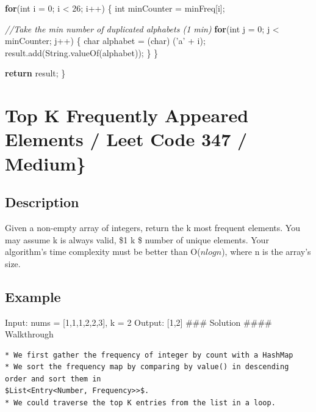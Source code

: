 \documentclass[]{book}
\newenvironment{Shaded}{\begin{snugshade}}{\end{snugshade}}
\newcommand{\BuiltInTok}[1]{#1}
\newcommand{\CharTok}[1]{\textcolor[rgb]{0.31,0.60,0.02}{#1}}
\newcommand{\CommentTok}[1]{\textcolor[rgb]{0.56,0.35,0.01}{\textit{#1}}}
\newcommand{\DataTypeTok}[1]{\textcolor[rgb]{0.13,0.29,0.53}{#1}}
\newcommand{\DecValTok}[1]{\textcolor[rgb]{0.00,0.00,0.81}{#1}}
\newcommand{\FunctionTok}[1]{\textcolor[rgb]{0.00,0.00,0.00}{#1}}
\newcommand{\KeywordTok}[1]{\textcolor[rgb]{0.13,0.29,0.53}{\textbf{#1}}}
\newcommand{\NormalTok}[1]{#1}
\begin{document}
\begin{Shaded}
\begin{Highlighting}[]
    \KeywordTok{for}\NormalTok{(}\DataTypeTok{int}\NormalTok{ i = }\DecValTok{0}\NormalTok{; i < }\DecValTok{26}\NormalTok{; i++) \{}
        \DataTypeTok{int}\NormalTok{ minCounter = minFreq[i];}

        \CommentTok{//Take the min number of duplicated alphabets (1 min)}
        \KeywordTok{for}\NormalTok{(}\DataTypeTok{int}\NormalTok{ j = }\DecValTok{0}\NormalTok{; j < minCounter; j++) \{}
            \DataTypeTok{char}\NormalTok{ alphabet = (}\DataTypeTok{char}\NormalTok{) (}\CharTok{'a'}\NormalTok{ + i);}
\NormalTok{            result.}\FunctionTok{add}\NormalTok{(}\BuiltInTok{String}\NormalTok{.}\FunctionTok{valueOf}\NormalTok{(alphabet));}
\NormalTok{        \}}
\NormalTok{    \}}

    \KeywordTok{return}\NormalTok{ result;}
\NormalTok{\}}
\end{Highlighting}
\end{Shaded}

\hypertarget{top-k-frequently-appeared-elements-leet-code-347-medium}{%
\section{Top K Frequently Appeared Elements / Leet Code 347 / Medium\}}\label{top-k-frequently-appeared-elements-leet-code-347-medium}}

\hypertarget{description-24}{%
\subsection{Description}\label{description-24}}

Given a non-empty array of integers, return the k most frequent elements. You may assume k is always valid,
\$1 \le k \le \$ number of unique elements. Your algorithm's time complexity must be better than O(\(n log n\)), where n
is the array's size.

\hypertarget{example-23}{%
\subsection{Example}\label{example-23}}

Input: nums = {[}1,1,1,2,2,3{]}, k = 2 Output: {[}1,2{]}
\#\#\# Solution
\#\#\#\# Walkthrough

\begin{verbatim}
* We first gather the frequency of integer by count with a HashMap
* We sort the frequency map by comparing by value() in descending order and sort them in
$List<Entry<Number, Frequency>>$.
* We could traverse the top K entries from the list in a loop.
\end{verbatim}
\end{document}
